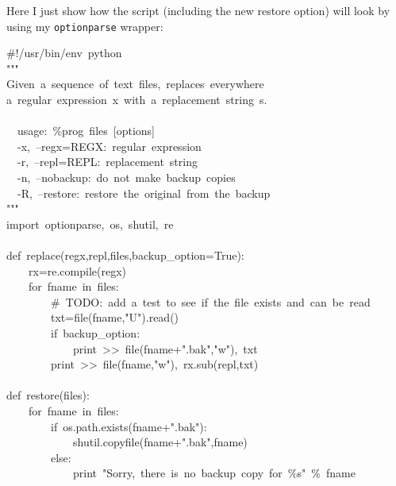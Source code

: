 \documentclass[10pt,english]{article}
\begin{document}
Here I just show how the script (including the new restore option)
will look by using my \texttt{optionparse} wrapper:
\begin{ttfamily}\begin{flushleft}
\mbox{{\#}!/usr/bin/env~python}\\
\mbox{"""}\\
\mbox{Given~a~sequence~of~text~files,~replaces~everywhere}\\
\mbox{a~regular~expression~x~with~a~replacement~string~s.}\\
\mbox{}\\
\mbox{~~usage:~{\%}prog~files~[options]}\\
\mbox{~~-x,~--regx=REGX:~regular~expression}\\
\mbox{~~-r,~--repl=REPL:~replacement~string}\\
\mbox{~~-n,~--nobackup:~do~not~make~backup~copies}\\
\mbox{~~-R,~--restore:~restore~the~original~from~the~backup}\\
\mbox{"""}\\
\mbox{import~optionparse,~os,~shutil,~re}\\
\mbox{}\\
\mbox{def~replace(regx,repl,files,backup{\_}option=True):}\\
\mbox{~~~~rx=re.compile(regx)}\\
\mbox{~~~~for~fname~in~files:}\\
\mbox{~~~~~~~~{\#}~TODO:~add~a~test~to~see~if~the~file~exists~and~can~be~read}\\
\mbox{~~~~~~~~txt=file(fname,"U").read()}\\
\mbox{~~~~~~~~if~backup{\_}option:}\\
\mbox{~~~~~~~~~~~~print~>>~file(fname+".bak","w"),~txt}\\
\mbox{~~~~~~~~print~>>~file(fname,"w"),~rx.sub(repl,txt)}\\
\mbox{}\\
\mbox{def~restore(files):}\\
\mbox{~~~~for~fname~in~files:~~~~~~~}\\
\mbox{~~~~~~~~if~os.path.exists(fname+".bak"):}\\
\mbox{~~~~~~~~~~~~shutil.copyfile(fname+".bak",fname)}\\
\mbox{~~~~~~~~else:}\\
\mbox{~~~~~~~~~~~~print~"Sorry,~there~is~no~backup~copy~for~{\%}s"~{\%}~fname}\\
\mbox{}\\

\end{flushleft}
\end{ttfamily}
\end{document}
